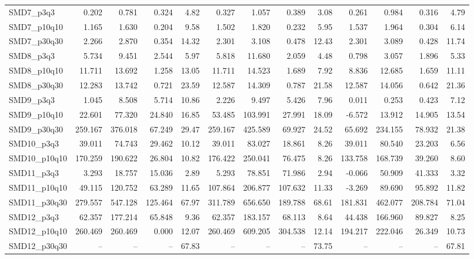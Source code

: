 \begin{longtable}{lrrrrrrrrrrrr}
SMD7\_p3q3 & 0.202 & 0.781 & 0.324 & 4.82 & 0.327 & 1.057 & 0.389 & 3.08 & 0.261 & 0.984 & 0.316 & 4.79 \\
SMD7\_p10q10 & 1.165 & 1.630 & 0.204 & 9.58 & 1.502 & 1.820 & 0.232 & 5.95 & 1.537 & 1.964 & 0.304 & 6.14 \\
SMD7\_p30q30 & 2.266 & 2.870 & 0.354 & 14.32 & 2.301 & 3.108 & 0.478 & 12.43 & 2.301 & 3.089 & 0.428 & 11.74 \\
SMD8\_p3q3 & 5.734 & 9.451 & 2.544 & 5.97 & 5.818 & 11.680 & 2.059 & 4.48 & 0.798 & 3.057 & 1.896 & 5.33 \\
SMD8\_p10q10 & 11.711 & 13.692 & 1.258 & 13.05 & 11.711 & 14.523 & 1.689 & 7.92 & 8.836 & 12.685 & 1.659 & 11.11 \\
SMD8\_p30q30 & 12.283 & 13.742 & 0.721 & 23.59 & 12.587 & 14.309 & 0.787 & 21.58 & 12.587 & 14.056 & 0.642 & 21.36 \\
SMD9\_p3q3 & 1.045 & 8.508 & 5.714 & 10.86 & 2.226 & 9.497 & 5.426 & 7.96 & 0.011 & 0.253 & 0.423 & 7.12 \\
SMD9\_p10q10 & 22.601 & 77.320 & 24.840 & 16.85 & 53.485 & 103.991 & 27.991 & 18.09 & -6.572 & 13.912 & 14.905 & 13.54 \\
SMD9\_p30q30 & 259.167 & 376.018 & 67.249 & 29.47 & 259.167 & 425.589 & 69.927 & 24.52 & 65.692 & 234.155 & 78.932 & 21.38 \\
SMD10\_p3q3 & 39.011 & 74.743 & 29.462 & 10.12 & 39.011 & 83.027 & 18.861 & 8.26 & 39.011 & 80.540 & 23.203 & 6.56 \\
SMD10\_p10q10 & 170.259 & 190.622 & 26.804 & 10.82 & 176.422 & 250.041 & 76.475 & 8.26 & 133.758 & 168.739 & 39.260 & 8.60 \\
SMD11\_p3q3 & 3.293 & 18.757 & 15.036 & 2.89 & 5.293 & 78.851 & 71.986 & 2.94 & -0.066 & 50.909 & 41.333 & 3.32 \\
SMD11\_p10q10 & 49.115 & 120.752 & 63.289 & 11.65 & 107.864 & 206.877 & 107.632 & 11.33 & -3.269 & 89.690 & 95.892 & 11.82 \\
SMD11\_p30q30 & 279.557 & 547.128 & 125.464 & 67.97 & 311.789 & 656.650 & 189.788 & 68.61 & 181.831 & 462.077 & 208.784 & 71.04 \\
SMD12\_p3q3 & 62.357 & 177.214 & 65.848 & 9.36 & 62.357 & 183.157 & 68.113 & 8.64 & 44.438 & 166.960 & 89.827 & 8.25 \\
SMD12\_p10q10 & 260.469 & 260.469 & 0.000 & 12.07 & 260.469 & 609.205 & 304.538 & 12.14 & 194.217 & 222.046 & 26.349 & 10.73 \\
SMD12\_p30q30 & -- & -- & -- & 67.83 & -- & -- & -- & 73.75 & -- & -- & -- & 67.81 \\
\end{longtable}
\endgroup

